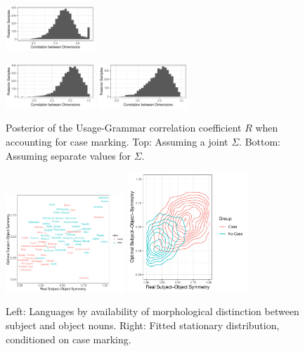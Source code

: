 \documentclass[11pt,a4paper]{article}
\begin{document}
\begin{figure}
    \centering
    \includegraphics[width=0.3\textwidth]{change/figures/corr_ornuhl-binom_42.pdf}
    
    \includegraphics[width=0.3\textwidth]{change/figures/corr_ornuhl-binom_45_Case.pdf}
    \includegraphics[width=0.3\textwidth]{change/figures/corr_ornuhl-binom_45_NoCase.pdf}
    \caption{Posterior of the Usage-Grammar correlation coefficient $R$ when accounting for case marking. Top: Assuming a joint $\Sigma$. Bottom: Assuming separate values for $\Sigma$.}
    \label{fig:posterior-case}
\end{figure}

\begin{figure}
    \centering
    \includegraphics[width=0.4\textwidth]{figures/by_patient_marking.pdf}
    \includegraphics[width=0.4\textwidth]{change/visualize/stationary_case.pdf}
    \caption{Left: Languages by availability of morphological distinction between subject and object nouns. Right: Fitted stationary distribution, conditioned on case marking.}
    \label{fig:langs-case}
\end{figure}
\end{document}
